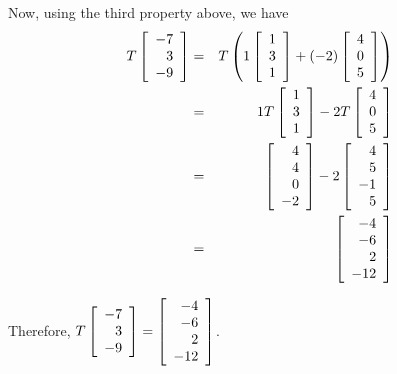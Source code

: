 \begin{solution}
Now, using the third property above, we have 
\begin{eqnarray*}
T \left[ \begin{array}{r}
-7 \\
3 \\
-9
\end{array} \right]
&=&
T \left(
1
\left[ \begin{array}{r}
1 \\
3 \\
1
\end{array} \right]
+
(-2)
\left[ \begin{array}{r}
4 \\
0 \\
5
\end{array} \right]
\right) \\
&=& 
1T 
\left[ \begin{array}{r}
1 \\
3 \\
1
\end{array} \right]
-2T
\left[ \begin{array}{r}
4 \\
0 \\
5
\end{array} \right]
\\
&=&
\left[ \begin{array}{r}
4 \\
4 \\
0 \\
-2
\end{array} \right]
-2
\left[ \begin{array}{r}
4 \\
5 \\
-1 \\
5
\end{array} \right]
\\
&=& 
\left[
\begin{array}{r}
-4 \\
-6 \\
2 \\
-12
\end{array}
\right]
\end{eqnarray*}

Therefore, $T \left[ \begin{array}{r}
-7 \\
3 \\
-9
\end{array}
\right]
=
\left[
\begin{array}{r}
-4 \\
-6 \\
2 \\
-12
\end{array}
\right]
$.
\end{solution}

